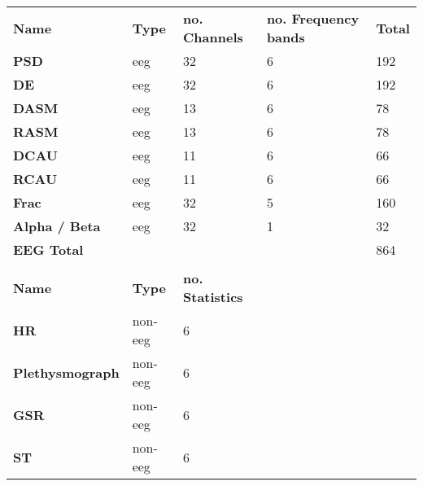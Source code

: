 \begin{table}[]
\centering
\begin{tabular}{lllll}
\textbf{Name}           & \textbf{Type} & \textbf{no. Channels}   & \textbf{no. Frequency bands} & \textbf{Total} \\
\textbf{PSD}            & eeg           & 32                            & 6                         & 192          \\
\textbf{DE}             & eeg           & 32                            & 6                         & 192          \\
\textbf{DASM}           & eeg           & 13                            & 6                         & 78           \\
\textbf{RASM}           & eeg           & 13                            & 6                         & 78           \\
\textbf{DCAU}           & eeg           & 11                            & 6                         & 66           \\
\textbf{RCAU}           & eeg  & 11                            & 6                         & 66           \\
\textbf{Frac}           & eeg           & 32                            & 5                         & 160          \\
\textbf{Alpha / Beta}   & eeg           & 32                            & 1                         & 32           \\
\textbf{EEG Total}      &               &                               &                           & 864          \\
                        &               &                               &                           &              \\
\textbf{Name}           & \textbf{Type} & \textbf{no. Statistics} &                          &              \\
\textbf{HR}             & non-eeg       & 6                             &                           &              \\
\textbf{Plethysmograph} & non-eeg       & 6                             &                           &              \\
\textbf{GSR}            & non-eeg       & 6                             &                           &              \\
\textbf{ST}             & non-eeg       & 6                             &                           &              \\

\end{tabular}
\end{table}
